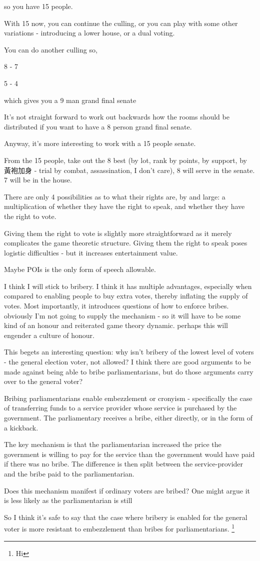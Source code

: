 so you have 15 people.

With 15 now, you can continue the culling, or you can play with some other variations - introducing a lower house, or a dual voting.

You can do another culling so,

8 - 7

5 - 4

which gives you a 9 man grand final senate

It's not straight forward to work out backwards how the rooms should be distributed if you want to have a 8 person grand final senate.

Anyway, it's more interesting to work with a 15 people senate.

From the 15 people, take out the 8 best (by lot, rank by points, by support, by 黃袍加身 - trial by combat, assassination, I don't care), 8 will serve in the senate. 7 will be in the house.

There are only 4 possibilities as to what their rights are, by and large: a multiplication of whether they have the right to speak, and whether they have the right to vote.

Giving them the right to vote is slightly more straightforward as it merely complicates the game theoretic structure. Giving them the right to speak poses logistic difficulties - but it increases entertainment value.

Maybe POIs is the only form of speech allowable.

I think I will stick to bribery. I think it has multiple advantages, especially when compared to enabling people to buy extra votes, thereby inflating the supply of votes. Most importantly, it introduces questions of how to enforce bribes. obviously I'm not going to supply the mechanism - so it will have to be some kind of an honour and reiterated game theory dynamic. perhaps this will engender a culture of honour.

This begets an interesting question: why isn't bribery of the lowest level of voters - the general election voter, not allowed? I think there are good arguments to be made against being able to bribe parliamentarians, but do those arguments carry over to the general voter?

Bribing parliamentarians enable embezzlement or cronyism - specifically the case of transferring funds to a service provider whose service is purchased by the government. The parliamentary receives a bribe, either directly, or in the form of a kickback.

The key mechanism is that the parliamentarian increased the price the government is willing to pay for the service than the government would have paid if there was no bribe. The difference is then split between the service-provider and the bribe paid to the parliamentarian.

Does this mechanism manifest if ordinary voters are bribed? One might argue it is less likely as the parliamentarian is still

So I think it's safe to say that the case where bribery is enabled for the general voter is more resistant to embezzlement than bribes for parliamentarians. \footnote{Hi}